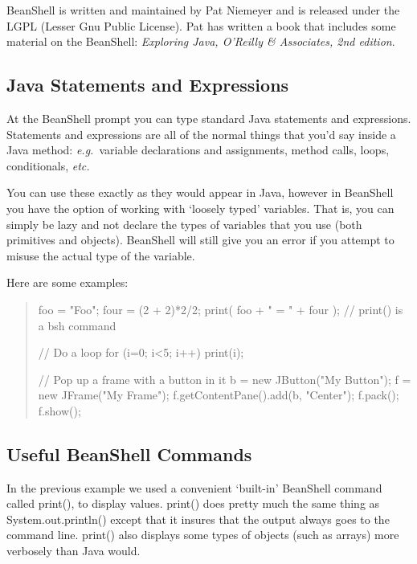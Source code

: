 \documentclass[twoside,11pt,nolof]{starlink}
\providecommand{\eg}{\textit{e.g.}}
\providecommand{\etc}{\textit{etc.}}
\begin{document}
BeanShell is written and maintained by Pat Niemeyer
 and is
released under the LGPL (Lesser Gnu Public License). Pat has written a
book that includes some material on the BeanShell: \textit{Exploring
Java, O'Reilly \& Associates, 2nd edition}.

\subsection{Java Statements and Expressions}

At the BeanShell prompt you can type standard Java statements and
expressions.  Statements and expressions are all of the normal things
that you'd say inside a Java method: \eg\ variable declarations and
assignments, method calls, loops, conditionals, \etc

You can use these exactly as they would appear in Java, however in
BeanShell you have the option of working with `loosely typed'
variables.  That is, you can simply be lazy and not declare the types
of variables that you use (both primitives and objects).  BeanShell
will still give you an error if you attempt to misuse the actual type
of the variable.

Here are some examples:
\begin{quote}
\begin{terminalv}
    foo = "Foo";
    four = (2 + 2)*2/2;
    print( foo + " = " + four );   // print() is a bsh command

    // Do a loop
    for (i=0; i<5; i++)
        print(i);

    // Pop up a frame with a button in it
    b = new JButton("My Button");
    f = new JFrame("My Frame");
    f.getContentPane().add(b, "Center");
    f.pack();
    f.show();
\end{terminalv}
\end{quote}

\subsection{Useful BeanShell Commands}

In the previous example we used a convenient `built-in' BeanShell
command called print(), to display values.  print() does pretty much
the same thing as System.out.println() except that it insures that the
output always goes to the command line.  print() also displays some
types of objects (such as arrays) more verbosely than Java would.
\end{document}
